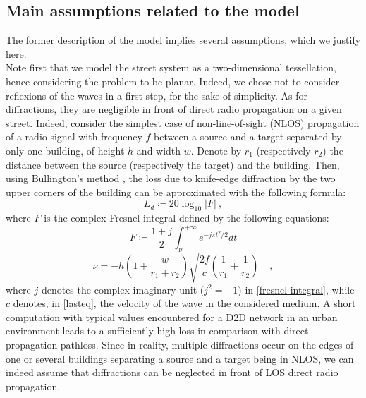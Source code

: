 \documentclass[conference]{IEEEtran}
\begin{document}
\subsection{Main assumptions related to the model}
\label{assumption}
The former description of the model implies several assumptions, which we justify here. \\
\indent Note first that we model the street system as a two-dimensional tessellation, hence considering the problem to be planar. Indeed, we chose not to consider reflexions of the waves in a first step, for the sake of simplicity. As for diffractions, they are negligible in front of direct radio propagation on a given street. Indeed, consider the simplest case of non-line-of-sight (NLOS) propagation of a radio signal with frequency $f$ between a source and a target separated by only one building, of height $h$ and width $w$. Denote by $r_{1}$ (respectively $r_{2}$) the distance between the source (respectively the target) and the building. Then, using Bullington's method \cite{bullington1947radio}, the loss due to knife-edge diffraction by the two upper corners of the building can be approximated with the following formula: %
\begin{equation}
\label{fading}
L_{d} \coloneqq 20\log_{10}\vert F \vert \: ,
\end{equation}
where $F$ is the complex Fresnel integral defined by the following equations:
\begin{equation}
\label{fresnel-integral}
F \coloneqq \frac{1+j}{2} \int_{\nu}^{+\infty} e^{-j\pi t^{2}/2}dt
\end{equation}
\begin{equation}
\label{lasteq}
\nu = -h\left(1+\frac{w}{r_{1}+r_{2}}\right)\sqrt{\frac{2f}{c}\left(\frac{1}{r_{1}}+\frac{1}{r_{2}}\right)} \quad ,
\end{equation}
where $j$ denotes the complex imaginary unit ($j^{2}=-1$) in \eqref{fresnel-integral}, while $c$ denotes, in \eqref{lasteq}, the velocity of the wave in the considered medium. A short computation with typical values encountered for a D2D network in an urban environment leads to a sufficiently high loss in comparison with direct propagation pathloss. Since in reality, multiple diffractions occur on the edges of one or several buildings separating a source and a target being in NLOS, we can indeed assume that diffractions can be neglected in front of LOS direct radio propagation. \\
\end{document}
